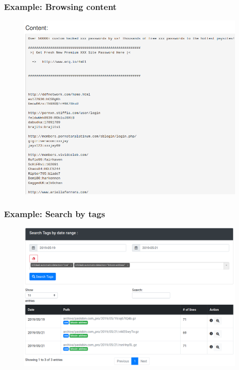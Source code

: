 \begin{frame}
    \frametitle{Example: Browsing content}
    \begin{figure}
        \includegraphics[scale=0.3, angle=0]{images/ail_06.png}
    \end{figure}
\end{frame}

\begin{frame}
    \frametitle{Example: Search by tags}
    \begin{figure}
        \includegraphics[scale=0.26, angle=0]{images/ail_14.png}
    \end{figure}
\end{frame}


